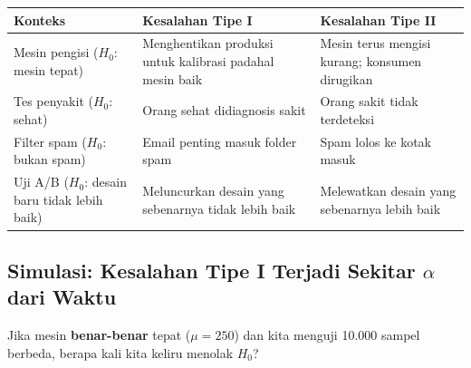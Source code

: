 \documentclass[
  indonesian,
  letterpaper,
]{book}
\newcounter{none} %
\begin{document}
{\def\LTcaptype{none} %
\begin{longtable}[]{@{}
  >{\raggedright\arraybackslash}p{}
  >{\raggedright\arraybackslash}p{}
  >{\raggedright\arraybackslash}p{}@{}}
\toprule\noalign{}
\begin{minipage}[b]{\linewidth}\raggedright
Konteks
\end{minipage} & \begin{minipage}[b]{\linewidth}\raggedright
Kesalahan Tipe I
\end{minipage} & \begin{minipage}[b]{\linewidth}\raggedright
Kesalahan Tipe II
\end{minipage} \\
\midrule\noalign{}
\endhead
\bottomrule\noalign{}
\endlastfoot
Mesin pengisi (\(H_0\): mesin tepat) & Menghentikan produksi untuk
kalibrasi padahal mesin baik & Mesin terus mengisi kurang; konsumen
dirugikan \\
Tes penyakit (\(H_0\): sehat) & Orang sehat didiagnosis sakit & Orang
sakit tidak terdeteksi \\
Filter spam (\(H_0\): bukan spam) & Email penting masuk folder spam &
Spam lolos ke kotak masuk \\
Uji A/B (\(H_0\): desain baru tidak lebih baik) & Meluncurkan desain
yang sebenarnya tidak lebih baik & Melewatkan desain yang sebenarnya
lebih baik \\
\end{longtable}
}

\subsection{\texorpdfstring{Simulasi: Kesalahan Tipe I Terjadi Sekitar
\(\alpha\) dari
Waktu}{Simulasi: Kesalahan Tipe I Terjadi Sekitar \textbackslash alpha dari Waktu}}\label{simulasi-kesalahan-tipe-i-terjadi-sekitar-alpha-dari-waktu}

Jika mesin \textbf{benar-benar} tepat (\(\mu = 250\)) dan kita menguji
10.000 sampel berbeda, berapa kali kita keliru menolak \(H_0\)?
\end{document}
